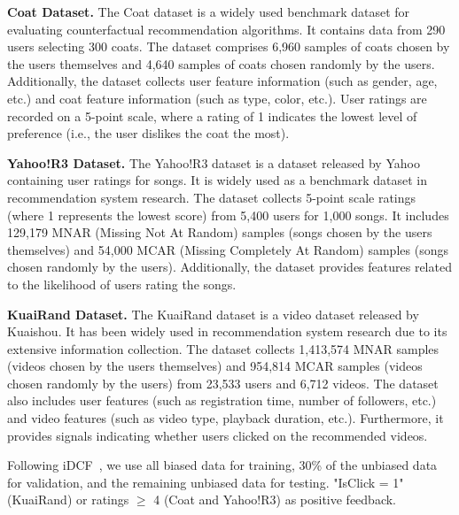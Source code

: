 \documentclass[sigconf]{acmart}
\begin{document}
\textbf{Coat Dataset.} The Coat dataset \cite{coat} is a widely used benchmark dataset for evaluating  counterfactual recommendation algorithms. It contains data from 290 users selecting 300 coats. The dataset comprises  6,960 samples of coats chosen by the users themselves and 4,640 samples of coats chosen randomly by the users. Additionally, the dataset collects user feature information (such as gender, age, etc.) and coat feature information (such as type, color, etc.). User ratings are recorded on a 5-point scale, where a rating of 1 indicates the lowest level of preference (i.e., the user dislikes the coat the most).


\textbf{Yahoo!R3 Dataset.} The Yahoo!R3 dataset \cite{yahoo} is a dataset released by Yahoo containing user ratings for songs. It is widely used as a benchmark dataset in recommendation system research. The dataset collects 5-point scale ratings (where 1 represents the lowest score) from 5,400 users for 1,000 songs. It includes 129,179 MNAR (Missing Not At Random) samples (songs chosen by the users themselves) and 54,000 MCAR (Missing Completely At Random) samples (songs chosen randomly by the users). Additionally, the dataset provides features related to the likelihood of users rating the songs.

\textbf{KuaiRand Dataset.} The KuaiRand dataset \cite{gao2022kuairand} is a video dataset released by Kuaishou. It has been widely used in recommendation system research due to its extensive information collection. The dataset collects 1,413,574 MNAR samples (videos chosen by the users themselves) and 954,814 MCAR samples (videos chosen randomly by the users) from 23,533 users and 6,712 videos. The dataset also includes user features (such as registration time, number of followers, etc.) and video features (such as video type, playback duration, etc.). Furthermore, it provides signals indicating whether users clicked on the recommended videos.

Following iDCF~\cite{idcf}, we use all biased data for training, 30\% of the unbiased data for validation, and the remaining unbiased data for testing. 
"IsClick = 1" (KuaiRand) or ratings $\geq$ 4 (Coat and Yahoo!R3) as positive feedback.


\begin{table}
\centering
\caption{The statistic of Coat, Yahoo!R3, and KuaiRand.}
\label{t1}
\end{table}
\end{document}

